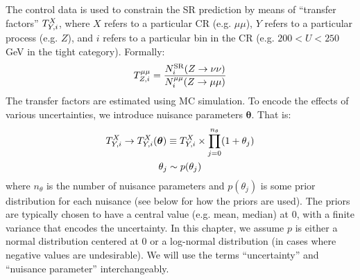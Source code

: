 The control data is used to constrain the SR prediction by means of ``transfer factors'' ${T}^{X}_{Y,i}$, where $X$ refers to a particular CR (e.g. $\mu\mu$), $Y$ refers to a particular process (e.g. $Z$), and $i$ refers to a particular bin in the CR (e.g. $200<U<250$ GeV in the tight category).
Formally:
\begin{equation}
    {T}^{\mu\mu}_{Z,i} = \frac{N^\mathrm{SR}_i(Z\rightarrow\nu\nu)}{N^{\mu\mu}_i(Z\rightarrow\mu\mu)}
\end{equation}
The transfer factors are estimated using MC simulation.
To encode the effects of various uncertainties, we introduce nuisance parameters $\bm{\theta}$.
That is:
\begin{gather}
    {T}^{X}_{Y,i} \rightarrow {T}^{X}_{Y,i}(\bm\theta) \equiv {T}^{X}_{Y,i} \times \prod_{j=0}^{n_\theta} (1+\theta_j) \\ 
    \theta_j \sim p(\theta_j) 
\end{gather}
where $n_\theta$ is the number of nuisance parameters and $p(\theta_j)$ is some prior distribution for each nuisance (see below for how the priors are used).
The priors are typically chosen to have a central value (e.g. mean, median) at $0$, with a finite variance that encodes the uncertainty.
In this chapter, we assume $p$ is either a normal distribution centered at 0 or a log-normal distribution (in cases where negative values are undesirable). 
We will use the terms ``uncertainty'' and ``nuisance parameter'' interchangeably. 

